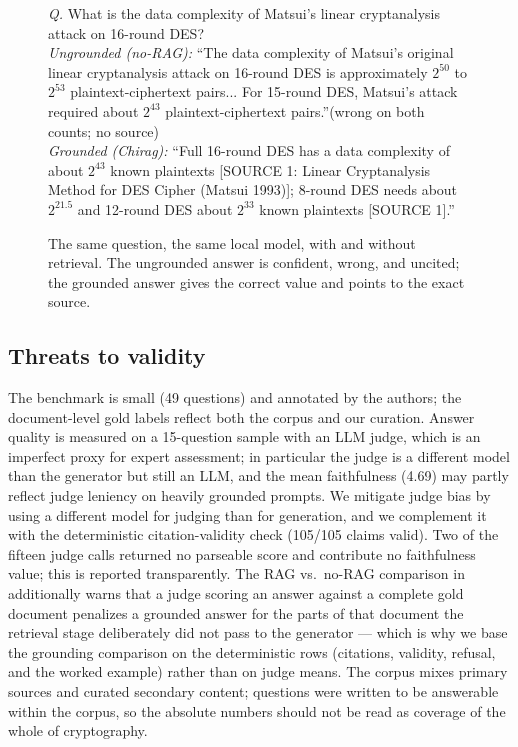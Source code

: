 \documentclass[version=submission]{iacrcc}
\begin{document}
\begin{figure}[t]
\centering
\small
\begin{minipage}{0.95\linewidth}
\emph{Q.} What is the data complexity of Matsui's linear cryptanalysis
attack on 16-round DES?\\[1mm]
\emph{Ungrounded (no-RAG):}
``The data complexity of Matsui's original linear cryptanalysis attack on
16-round DES is approximately $2^{50}$ to $2^{53}$ plaintext-ciphertext
pairs... For 15-round DES, Matsui's attack required about $2^{43}$
plaintext-ciphertext pairs.''\quad (wrong on both counts; no source)\\[2mm]
\emph{Grounded (Chirag):}
``Full 16-round DES has a data complexity of about $2^{43}$ known
plaintexts [SOURCE 1: Linear Cryptanalysis Method for DES Cipher (Matsui
1993)]; 8-round DES needs about $2^{21.5}$ and 12-round DES about $2^{33}$
known plaintexts [SOURCE 1].''
\end{minipage}
\caption{The same question, the same local model, with and without retrieval.
The ungrounded answer is confident, wrong, and uncited; the grounded answer
gives the correct value and points to the exact source.}
\label{fig:baseline}
\end{figure}

\subsection{Threats to validity}
\label{subsec:threats}
The benchmark is small (49 questions) and annotated by the authors; the
document-level gold labels reflect both the corpus and our curation. Answer
quality is measured on a 15-question sample with an LLM judge, which is an
imperfect proxy for expert assessment; in particular the judge is a different
model than the generator but still an LLM, and the mean faithfulness (4.69)
may partly reflect judge leniency on heavily grounded prompts. We mitigate
judge bias by using a different model for judging than for generation, and we
complement it with the deterministic citation-validity check (105/105 claims
valid). Two of the fifteen judge calls returned no parseable score and
contribute no faithfulness value; this is reported transparently. The RAG
vs.\ no-RAG comparison in  additionally warns that a
judge scoring an answer against a complete gold document penalizes a grounded
answer for the parts of that document the retrieval stage deliberately did
not pass to the generator --- which is why we base the grounding comparison
on the deterministic rows (citations, validity, refusal, and the worked
example) rather than on judge means. The corpus mixes primary sources and
curated secondary content; questions were written to be answerable within the
corpus, so the absolute numbers should not be read as coverage of the whole
of cryptography.
\end{document}
